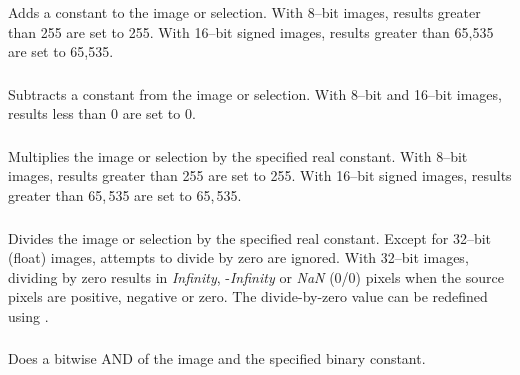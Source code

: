 Adds a constant to the image or selection.
With 8--bit images, results greater than 255 are set to 255. With
16--bit signed images, results greater than 65,535 are set to 65,535. 


\subsubsection{\protect{}}

Subtracts a constant from the
image or selection. With 8--bit and 16--bit images, results less than
0 are set to 0.


\subsubsection{\protect{}}

Multiplies the image or selection
by the specified real constant. With 8--bit images, results greater
than 255 are set to 255. With 16--bit signed images, results greater
than 65,\,535 are set to 65,\,535.


\subsubsection{\protect{}}

Divides the image or selection by
the specified real constant. Except for 32--bit (float) images, attempts
to divide by zero are ignored. With 32--bit images, dividing by zero
results in \emph{Infinity}, -\emph{Infinity} or \emph{NaN} (0/0) pixels
when the source pixels are positive, negative or zero. The divide-by-zero
value can be redefined using .


\subsubsection{\protect{}}

Does a bitwise AND of the image and the
specified binary constant.


\subsubsection{\protect{}}

